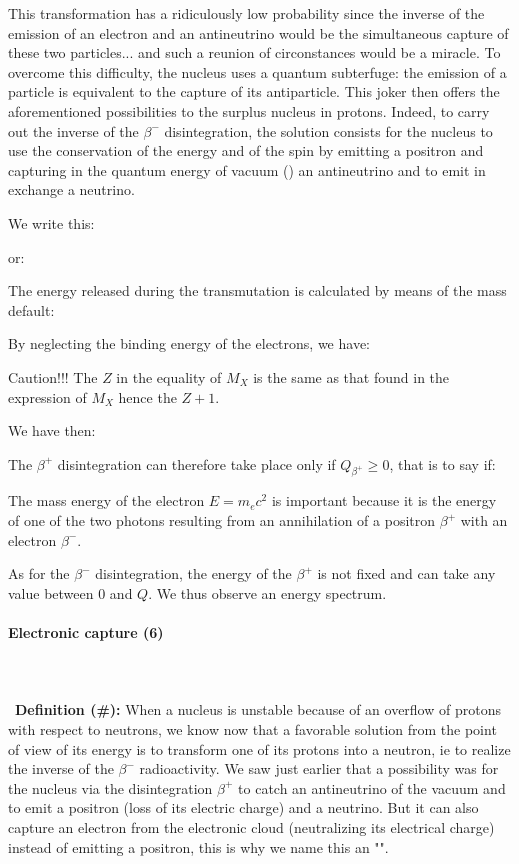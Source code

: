 	This transformation has a ridiculously low probability since the inverse of the emission of an electron and an antineutrino would be the simultaneous capture of these two particles... and such a reunion of circonstances would be a miracle. To overcome this difficulty, the nucleus uses a quantum subterfuge: the emission of a particle is equivalent to the capture of its antiparticle. This joker then offers the aforementioned possibilities to the surplus nucleus in protons. Indeed, to carry out the inverse of the $\beta^{-}$ disintegration, the solution consists for the nucleus to use the conservation of the energy and of the spin by emitting a positron and capturing in the quantum energy of vacuum () an antineutrino and to emit in exchange a neutrino.

	We write this:
	
	or:
	
	The energy released during the transmutation is calculated by means of the mass default:
	
	By neglecting the binding energy of the electrons, we have:
	
	Caution!!! The $Z$ in the equality of $M_X$ is the same as that found in the expression of $M_X$ hence the $Z + 1$.

	We have then:
	
	The $\beta^+$ disintegration can therefore take place only if $Q_{\beta^{+}}\ge 0$, that is to say if:
	
	The mass energy of the electron $E=m_ec^2$ is important because it is the energy of one of the two photons resulting from an annihilation of a positron $\beta^{+}$ with an electron $\beta^{-}$.

	As for the $\beta^{-}$ disintegration, the energy of the $\beta^{+}$ is not fixed and can take any value between $0$ and $Q$. We thus observe an energy spectrum.

	\paragraph{Electronic capture (6)}\mbox{}\\\\\
	\textbf{Definition (\#\mydef):} When a nucleus is unstable because of an overflow of protons with respect to neutrons, we know now that a favorable solution from the point of view of its energy is to transform one of its protons into a neutron, ie to realize the inverse of the $\beta^{-}$ radioactivity. We saw just earlier that a possibility was for the nucleus via the disintegration $\beta^{+}$ to catch an antineutrino of the vacuum and to emit a positron (loss of its electric charge) and a neutrino. But it can also capture an electron from the electronic cloud (neutralizing its electrical charge) instead of emitting a positron, this is why we name this an "".

